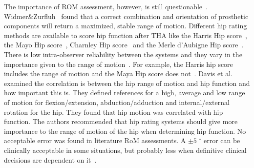 \documentclass[whitelogo]{tudelft-report}
\begin{document}
{The importance of ROM assessment, however, is still questionable~\cite{davis2007importance}. Widmer\&Zurfluh~\cite{widmer2004compliant} found that a correct combination and orientation of prosthetic components will return a maximized, stable range of motion. Different hip rating methods are available to score hip function after THA like the Harris Hip score~\cite{harris1969traumatic}, the Mayo Hip score~\cite{singh2016validation}, Charnley Hip score~\cite{charnley1972long} and the Merle d'Aubigne Hip score~\cite{d1954functional}. There is low intra-observer reliability between the systems and they vary in the importance given to the range of motion~\cite{callaghan1990assessing}. For example, the Harris hip score includes the range of motion and the Maya Hip score does not~\cite{singh2016validation}. Davis et al.~\cite{davis2007importance} examined the correlation is between the hip range of motion and hip function and how important this is. They defined references for a high, average and low range of motion for flexion/extension, abduction/adduction and internal/external rotation for the hip. They found that hip motion was correlated with hip function. The authors recommended that hip rating systems should give more importance to the range of motion of the hip when determining hip function. No acceptable error was found in literature RoM assessments. A $\pm 5$ $^\circ$ error can be clinically acceptable in some situations, but probably less when definitive clinical decisions are dependent on it~\cite{bruton2000reliability}.
	

}
\end{document}
